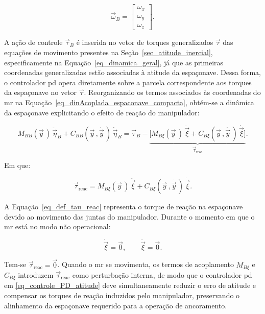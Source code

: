 \begin{equation}
\vec\omega_B =
\begin{bmatrix}
\omega_x \\
\omega_y \\
\omega_z
\end{bmatrix}.
\end{equation}

A ação de controle $\vec\tau_B$ é inserida no vetor de torques generalizados $\vec\tau$ das equações de movimento presentes na Seção~\ref{sec_atitude_inercial}, especificamente na Equação~\eqref{eq_dinamica_geral}, já que as primeiras coordenadas generalizadas estão associadas à atitude da espaçonave.
Dessa forma, o controlador \gls{pd} opera diretamente sobre a parcela correspondente aos torques da espaçonave no vetor $\vec\tau$.
Reorganizando os termos associados às coordenadas do \gls{mr} na
Equação~\eqref{eq_dinAcoplada_espaconave_compacta}, obtém-se a dinâmica da espaçonave explicitando o efeito de reação do manipulador:

\begin{equation}
M_{BB}(\vec y\,)\,\ddot{\vec\eta}_B
+
C_{BB}(\vec y\,,\dot{\vec y\,})\,\dot{\vec\eta}_B
=
\vec\tau_B
-
\underbrace{\bigl[
M_{B\xi}(\vec y\,)\,\ddot{\vec\xi}
+
C_{B\xi}(\vec y\,,\dot{\vec y\,})\,\dot{\vec\xi}
\bigr]}_{\displaystyle \vec\tau_{\text{reac}}}.
\label{eq_dina_espaconave_reac_compacta}
\end{equation}


Em que:

\begin{equation}
\vec\tau_{\text{reac}}
=
M_{B\xi}(\vec y\,)\,\ddot{\vec\xi}
+
C_{B\xi}(\vec y\,,\dot{\vec y\,})\,\dot{\vec\xi}.
\label{eq_def_tau_reac}
\end{equation}


A Equação~\ref{eq_def_tau_reac} representa o torque de reação na espaçonave devido ao movimento das juntas do manipulador.
Durante o momento em que o \gls{mr} está no modo não operacional:

\begin{equation}
\dot{\vec\xi} = \vec 0,
\qquad
\ddot{\vec\xi} = \vec 0.
\end{equation}


Tem-se $\vec\tau_{\text{reac}} = \vec 0$.
Quando o \gls{mr} se movimenta, os termos de acoplamento $M_{B\xi}$ e $C_{B\xi}$ introduzem $\vec\tau_{\text{reac}}$ como perturbação interna, de modo que o controlador \gls{pd} em \eqref{eq_controle_PD_atitude} deve simultaneamente reduzir o erro de atitude e compensar os torques de reação induzidos pelo manipulador, preservando o alinhamento da espaçonave requerido para a operação de ancoramento.
